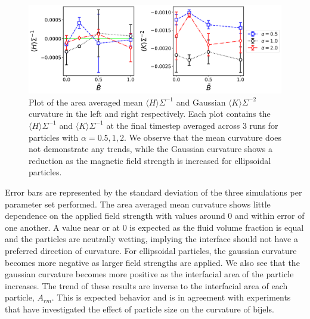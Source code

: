 \begin{figure} 
    \centering 
    \includegraphics[width=\textwidth]{figures/results/paper1/curvature-vs-B_ss.png} 
    \caption{Plot of the area averaged mean $\langle H \rangle \Sigma^{-1}$ and Gaussian 
            $\langle K \rangle \Sigma^{-2}$ curvature in the left and right respectively. Each 
            plot contains the $\langle H \rangle \Sigma^{-1}$ and $\langle K \rangle \Sigma^{-1}$ 
            at the final timestep averaged across 3 runs for particles with $\alpha = 0.5, 1, 2$. 
            We observe that the mean curvature does not demonstrate any trends, while the Gaussian 
            curvature shows a reduction as the magnetic field strength is increased for 
            ellipsoidal particles.} 
    \label{fig:curvature-vs-B_ss}
\end{figure}

Error bars are represented by the standard
deviation of the three simulations per parameter set performed. The area
averaged mean curvature shows little dependence on the applied field
strength with values around 0 and within error of one another. A value
near or at 0 is expected as the fluid volume fraction is equal and the
particles are neutrally wetting, implying the interface should not have
a preferred direction of curvature. \cite{jinnai_interfacial_2001} For
ellipsoidal particles, the gaussian curvature becomes more negative as
larger field strengths are applied. We also see that the gaussian
curvature becomes more positive as the interfacial area of the particle
increases. The trend of these results are inverse to the interfacial
area of each particle, \(A_{rm}\). This is expected behavior and is in
agreement with experiments that have investigated the effect of particle
size on the curvature of bijels. \cite{reeves_quantitative_2016}

